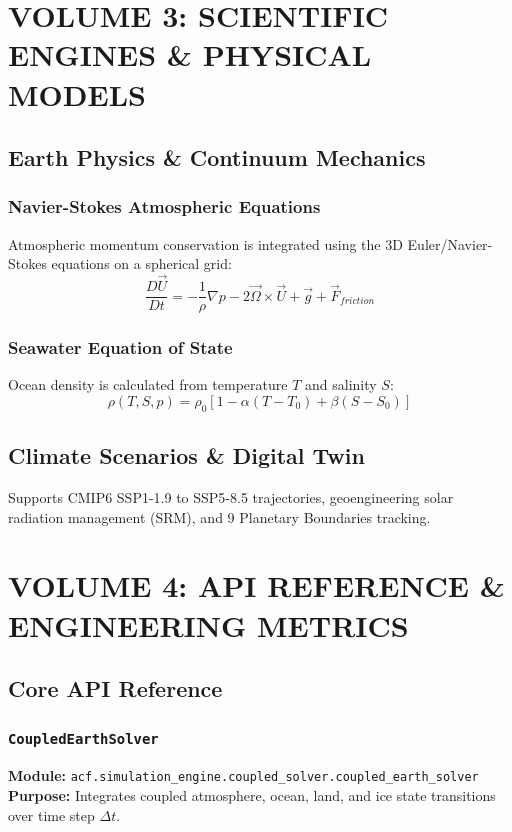 \documentclass[11pt,a4paper,oneside]{report}
\begin{document}
\part{VOLUME 3: SCIENTIFIC ENGINES \& PHYSICAL MODELS}

\chapter{Earth Physics \& Continuum Mechanics}
\section{Navier-Stokes Atmospheric Equations}
Atmospheric momentum conservation is integrated using the 3D Euler/Navier-Stokes equations on a spherical grid:
\begin{equation}
\frac{D\vec{U}}{Dt} = -\frac{1}{\rho}\nabla p - 2\vec{\Omega}\times\vec{U} + \vec{g} + \vec{F}_{friction}
\end{equation}

\section{Seawater Equation of State}
Ocean density is calculated from temperature $T$ and salinity $S$:
\begin{equation}
\rho(T, S, p) = \rho_0 \left[ 1 - \alpha(T - T_0) + \beta(S - S_0) \right]
\end{equation}

\chapter{Climate Scenarios \& Digital Twin}
Supports CMIP6 SSP1-1.9 to SSP5-8.5 trajectories, geoengineering solar radiation management (SRM), and 9 Planetary Boundaries tracking.

\part{VOLUME 4: API REFERENCE \& ENGINEERING METRICS}

\chapter{Core API Reference}
\section{\texttt{CoupledEarthSolver}}
\textbf{Module:} \texttt{acf.simulation_engine.coupled_solver.coupled_earth_solver}\\
\textbf{Purpose:} Integrates coupled atmosphere, ocean, land, and ice state transitions over time step $\Delta t$.
\end{document}
